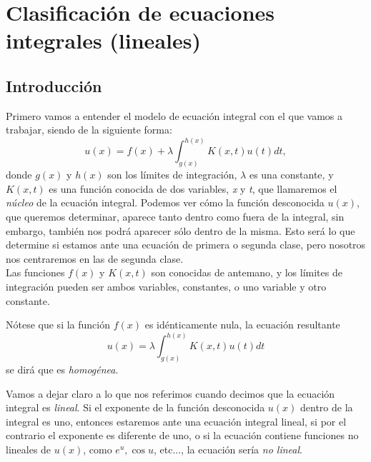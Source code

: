 
\chapter{Clasificación de ecuaciones integrales (lineales)}\label{ch:primer-capitulo}

\section{Introducción}
Primero vamos a entender el modelo de ecuación integral con el que vamos a trabajar, siendo de la siguiente forma:
\begin{equation}\label{}
	u(x) = f(x) + \lambda \int_{g(x)}^{h(x)} K(x,t)u(t)dt,
\end{equation}
donde $g(x)$ y $h(x)$ son los límites de integración, $\lambda$ es una constante, y $K(x,t)$ es una función conocida de dos variables, \textit{x} y \textit{t}, que llamaremos el \textit{núcleo} de la ecuación integral. Podemos ver cómo la función desconocida $u(x)$, que queremos determinar,  aparece tanto dentro como fuera de la integral, sin embargo, también nos podrá aparecer sólo dentro de la misma. Esto será lo que determine si estamos ante una ecuación de primera o segunda clase, pero nosotros nos centraremos en las de segunda clase.\\

Las funciones $f(x)$ y $K(x,t)$ son conocidas de antemano, y los límites de integración pueden ser ambos variables, constantes, o uno variable y otro constante.\\
\begin{observacion}
	Nótese que si la función $f(x)$ es idénticamente nula, la ecuación resultante 
	\begin{equation}\label{}
		u(x) = \lambda \int_{g(x)}^{h(x)} K(x,t)u(t)dt
	\end{equation}
	se dirá que es \textit{homogénea}.
\end{observacion}
\begin{observacion}
	Vamos a dejar claro a lo que nos referimos cuando decimos que la ecuación integral es \textit{lineal}. Si el exponente de la función desconocida $u(x)$ dentro de la integral es uno, entonces estaremos ante una ecuación integral lineal, si por el contrario el exponente es diferente de uno, o si la ecuación contiene funciones no lineales de $u(x)$, como $e^u, \cos u$, etc..., la ecuación sería \textit{no lineal}.
\end{observacion}

